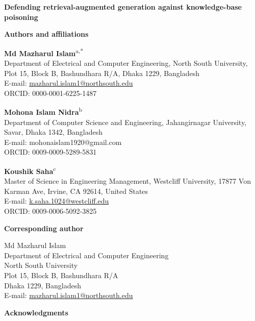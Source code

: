 \documentclass[12pt]{article}
\begin{document}
\begin{center}
{\Large\bfseries Defending retrieval-augmented generation against knowledge-base poisoning}
\end{center}

\bigskip

\noindent\textbf{Authors and affiliations}

\medskip

\noindent\textbf{Md Mazharul Islam}\textsuperscript{a,*}\\
Department of Electrical and Computer Engineering, North South University,
Plot 15, Block B, Bashundhara R/A, Dhaka 1229, Bangladesh\\
E-mail: \href{mailto:mazharul.islam1@northsouth.edu}{mazharul.islam1@northsouth.edu}\\
ORCID: 0000-0001-6225-1487

\medskip

\noindent\textbf{Mohona Islam Nidra}\textsuperscript{b}\\
Department of Computer Science and Engineering, Jahangirnagar University,
Savar, Dhaka 1342, Bangladesh\\
E-mail: mohonaislam1920@gmail.com\\
ORCID: 0009-0009-5289-5831

\medskip

\noindent\textbf{Koushik Saha}\textsuperscript{c}\\
Master of Science in Engineering Management, Westcliff University,
17877 Von Karman Ave, Irvine, CA 92614, United States\\
E-mail: \href{mailto:k.saha.1024@westcliff.edu}{k.saha.1024@westcliff.edu}\\
ORCID: 0009-0006-5092-3825

\bigskip

\noindent\textbf{Corresponding author}

\medskip

\noindent Md Mazharul Islam\\
Department of Electrical and Computer Engineering\\
North South University\\
Plot 15, Block B, Bashundhara R/A\\
Dhaka 1229, Bangladesh\\
E-mail: \href{mailto:mazharul.islam1@northsouth.edu}{mazharul.islam1@northsouth.edu}

\bigskip

\noindent\textbf{Acknowledgments}
\end{document}
